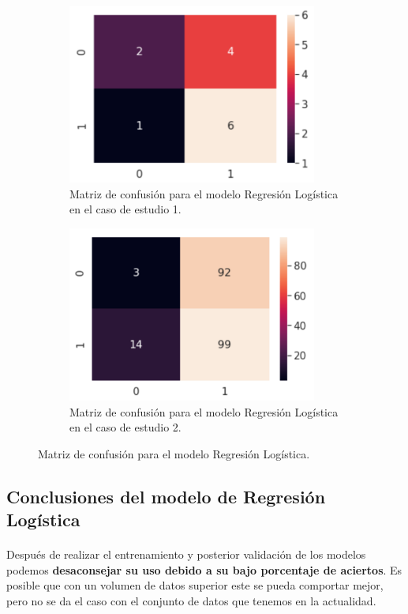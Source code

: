 \begin{figure}[!htb]
    \begin{subfigure}[b]{0.45\linewidth}
    	\centering
    	\includegraphics[width=0.9\textwidth]{images/resultados_lr_cm_conjunto1.png}
		\caption{Matriz de confusión para el modelo Regresión Logística en el caso de estudio 1.}
		\label{lrCMCase1}
	\end{subfigure}
	\begin{subfigure}[b]{0.45\linewidth} 
		\centering
	    \includegraphics[width=0.9\textwidth]{images/resultados_lr_cm_conjunto2.png}
		\caption{Matriz de confusión para el modelo Regresión Logística en el caso de estudio 2.}
	  \label{lrCMCase2}
	\end{subfigure}
	\caption{Matriz de confusión para el modelo Regresión Logística.}
	\label{lrcm}
\end{figure}

\subsection{Conclusiones del modelo de Regresión Logística}
\label{resultados:lr_conclusiones}

\paragraph{}
Después de realizar el entrenamiento y posterior validación de los modelos podemos \textbf{desaconsejar su uso debido a su bajo porcentaje de aciertos}. Es posible que con un volumen de datos superior este se pueda comportar mejor, pero no se da el caso con el conjunto de datos que tenemos en la actualidad.
